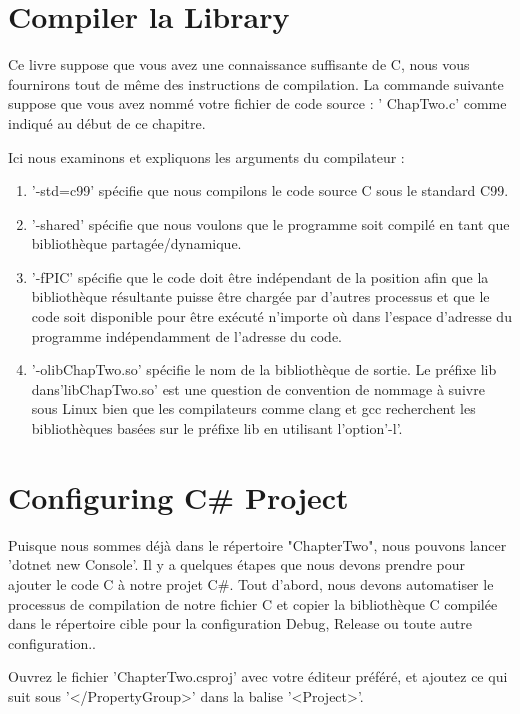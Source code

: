 

\section{Compiler la Library}
Ce livre suppose que vous avez une connaissance suffisante de C, nous vous fournirons tout de même des instructions de compilation. La commande suivante suppose que vous avez nommé votre fichier de code source : ' ChapTwo.c' comme indiqué au début de ce chapitre.


Ici nous examinons et expliquons les arguments du compilateur :

\begin{enumerate}
	\item '-std=c99' spécifie que nous compilons le code source C sous le standard C99.
	\item '-shared' spécifie que nous voulons que le programme soit compilé en tant que bibliothèque partagée/dynamique.
	\item '-fPIC' spécifie que le code doit être indépendant de la position afin que la bibliothèque résultante puisse être chargée par d'autres processus et que le code soit disponible pour être exécuté n'importe où dans l'espace d'adresse du programme indépendamment de l'adresse du code.
	\item '-olibChapTwo.so' spécifie le nom de la bibliothèque de sortie. Le préfixe lib dans'libChapTwo.so' est une question de convention de nommage à suivre sous Linux bien que les compilateurs comme clang et gcc recherchent les bibliothèques basées sur le préfixe lib en utilisant l'option'-l'. 
\end{enumerate}
\newpage
\section{Configuring C\# Project}
Puisque nous sommes déjà dans le répertoire "ChapterTwo", nous pouvons lancer 'dotnet new Console'. Il y a quelques étapes que nous devons prendre pour ajouter le code C à notre projet C\#. Tout d'abord, nous devons automatiser le processus de compilation de notre fichier C et copier la bibliothèque C compilée dans le répertoire cible pour la configuration Debug, Release ou toute autre configuration..

Ouvrez le fichier 'ChapterTwo.csproj' avec votre éditeur préféré, et ajoutez ce qui suit sous '</PropertyGroup>' dans la balise '<Project>'.

